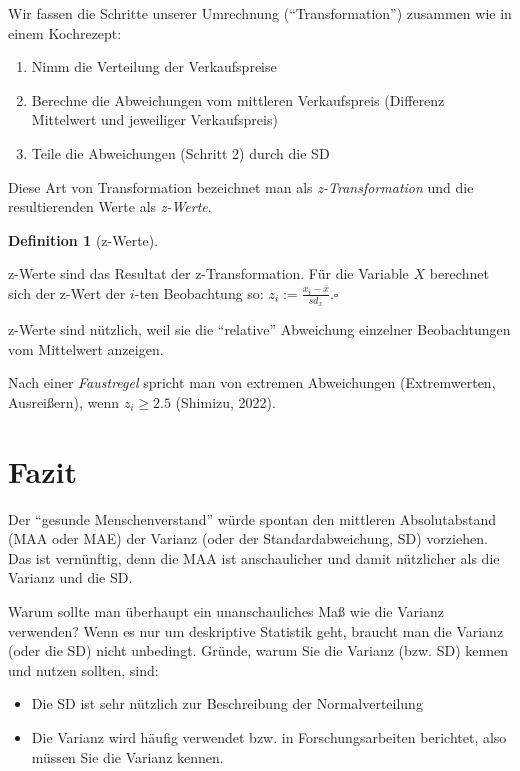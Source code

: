 \documentclass[
  letterpaper,
]{scrbook}
\providecommand{\tightlist}{%
  \setlength{\itemsep}{0pt}\setlength{\parskip}{0pt}}\usepackage{longtable,booktabs,array}
\theoremstyle{definition}
\theoremstyle{definition}
\theoremstyle{definition}
\newtheorem{definition}{Definition}[chapter]
\theoremstyle{remark}
\begin{document}
Wir fassen die Schritte unserer Umrechnung (\enquote{Transformation})
zusammen wie in einem Kochrezept:

\begin{enumerate}
\def\labelenumi{\arabic{enumi}.}
\tightlist
\item
  Nimm die Verteilung der Verkaufspreise
\item
  Berechne die Abweichungen vom mittleren Verkaufspreis (Differenz
  Mittelwert und jeweiliger Verkaufspreis)
\item
  Teile die Abweichungen (Schritt 2) durch die SD
\end{enumerate}

Diese Art von Transformation bezeichnet man als \emph{z-Transformation}
und die resultierenden Werte als \emph{z-Werte}.

\begin{definition}[z-Werte]\protect\hypertarget{def-z-werte}{}\label{def-z-werte}

z-Werte sind das Resultat der z-Transformation. Für die Variable \(X\)
berechnet sich der z-Wert der \(i\)-ten Beobachtung so:
\(z_i := \frac{x_i - \bar{x}}{sd_x}.\square\)

\end{definition}

z-Werte sind nützlich, weil sie die \enquote{relative} Abweichung
einzelner Beobachtungen vom Mittelwert anzeigen.

Nach einer \emph{Faustregel} spricht man von extremen Abweichungen
(Extremwerten, Ausreißern), wenn \(z_i \ge 2.5\) (Shimizu, 2022).

\section{Fazit}\label{fazit-2}

Der \enquote{gesunde Menschenverstand} würde spontan den mittleren
Absolutabstand (MAA oder MAE) der Varianz (oder der Standardabweichung,
SD) vorziehen. Das ist vernünftig, denn die MAA ist anschaulicher und
damit nützlicher als die Varianz und die SD.

Warum sollte man überhaupt ein unanschauliches Maß wie die Varianz
verwenden? Wenn es nur um deskriptive Statistik geht, braucht man die
Varianz (oder die SD) nicht unbedingt. Gründe, warum Sie die Varianz
(bzw. SD) kennen und nutzen sollten, sind:

\begin{itemize}
\tightlist
\item
  Die SD ist sehr nützlich zur Beschreibung der Normalverteilung
\item
  Die Varianz wird häufig verwendet bzw. in Forschungsarbeiten
  berichtet, also müssen Sie die Varianz kennen.
\end{itemize}
\end{document}
